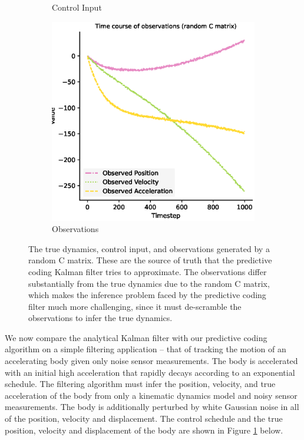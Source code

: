 \begin{figure}[H]
\begin{subfigure}{0.49\textwidth}
 \caption{Control Input}
 \end{subfigure}
 \begin{subfigure}{0.49\textwidth}\quad
 \centering
 \includegraphics[width=.95\linewidth]{chapter_3_figures/Random_observations.eps}
 \caption{Observations}
 \end{subfigure}
\caption{The true dynamics, control input, and observations generated by a random C matrix. These are the source of truth that the predictive coding Kalman filter tries to approximate. The observations differ substantially from the true dynamics due to the random C matrix, which makes the inference problem faced by the predictive coding filter much more challenging, since it must de-scramble the observations to infer the true dynamics.}

\label{KF_true_dynamics_figure}
\end{figure}

We now compare the analytical Kalman filter with our predictive coding algorithm on a simple filtering application -- that of tracking the motion of an accelerating body given only noise sensor measurements. The body is accelerated with an initial high acceleration that rapidly decays according to an exponential schedule. The filtering algorithm must infer the position, velocity, and true acceleration of the body from only a kinematic dynamics model and noisy sensor measurements. The body is additionally perturbed by white Gaussian noise in all of the position, velocity and displacement. The control schedule and the true position, velocity and displacement of the body are shown in Figure \ref{KF_true_dynamics_figure} below.

